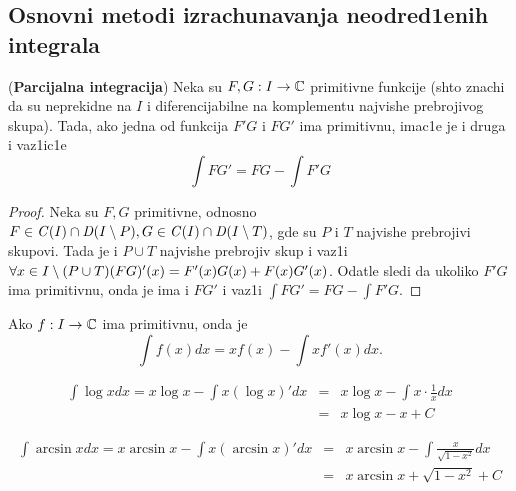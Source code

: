 \documentclass[../main.tex]{subfiles}
\begin{document}
\subsection{Osnovni metodi izrachunavanja neodred1enih integrala}
\begin{tvr}
(\textbf{Parcijalna integracija}) Neka su $F,G:I\to \mathbb{C}$ primitivne funkcije (shto znachi da su neprekidne na $I$
i diferencijabilne na komplementu najvishe prebrojivog skupa). Tada, ako jedna od funkcija $F'G$ i $FG'$ ima primitivnu, imac1e je i druga i vaz1ic1e
$$\int FG' = FG - \int F'G$$
\end{tvr}
\begin{proof}
Neka su $F,G$ primitivne, odnosno 
$F\in \mathit{C}(I) \cap \mathit D(I\setminus P), G\in \mathit{C}(I) \cap \mathit D(I\setminus T)$, gde su $P$ i $T$ najvishe prebrojivi skupovi.
Tada je i $P \cup T$ najvishe prebrojiv skup i vaz1i $\forall x \in I \setminus (P\cup T) (FG)'(x)=F'(x)G(x)+F(x)G'(x)$. Odatle sledi da ukoliko $F'G$ ima primitivnu,
onda je ima i $FG'$ i vaz1i $\int FG' = FG - \int F'G$. 
\end{proof}
\begin{posl}
Ako $f:I\to \mathbb{C}$ ima primitivnu, onda je 
$$\int f(x) dx=x f(x) - \int x f'(x) dx.$$
\end{posl}

\begin{pr}
\begin{eqnarray*}
 \int \log x dx = x \log x - \int x (\log x)' dx 
 &=& x\log x - \int x \cdot \frac{1}{x} dx \\
 &=& x \log x - x + C
\end{eqnarray*}
\end{pr}

\begin{pr}
\begin{eqnarray*}
 \int \arcsin x dx = x \arcsin x - \int x (\arcsin x)' dx 
 &=& x\arcsin x - \int \frac{x}{\sqrt{1-x^2}}dx \\
 &=& x \arcsin x +\sqrt{1-x^2} + C
\end{eqnarray*}
\end{pr}
\end{document}
